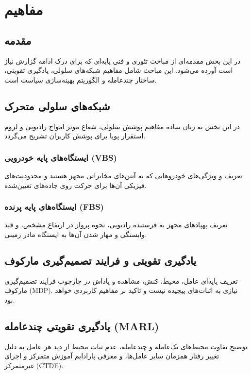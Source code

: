 \documentclass[a4paper,12pt,oneside]{report}
\begin{document}
\chapter{مفاهیم}

\section{مقدمه}
در این بخش مقدمه‌ای از مباحث تئوری و فنی پایه‌ای که برای درک ادامه گزارش نیاز است آورده می‌شود. این مباحث شامل مفاهیم شبکه‌های سلولی، یادگیری تقویتی، ساختار چندعامله و الگوریتم بهینه‌سازی سیاست است.

\section{شبکه‌های سلولی متحرک}
در این بخش به زبان ساده مفاهیم پوشش سلولی، شعاع موثر امواج رادیویی و لزوم استقرار پویا برای پوشش کاربران تشریح می‌گردد.

\subsection{ایستگاه‌های پایه خودرویی (VBS)}
تعریف و ویژگی‌های خودروهایی که به آنتن‌های مخابراتی مجهز هستند و محدودیت‌های فیزیکی آن‌ها برای حرکت روی جاده‌های تعیین‌شده.

\subsection{ایستگاه‌های پایه پرنده (FBS)}
تعریف پهپادهای مجهز به فرستنده رادیویی، نحوه پرواز در ارتفاع مشخص، و قید وابستگی و مهار شدن آن‌ها به ایستگاه مادر زمینی.

\section{یادگیری تقویتی و فرایند تصمیم‌گیری مارکوف}
تعریف پایه‌ای عامل، محیط، کنش، مشاهده و پاداش در چارچوب فرایند تصمیم‌گیری مارکوف (\gls{MDP}). نیازی به اثبات‌های پیچیده نیست و تاکید بر مفاهیم کاربردی خواهد بود.

\section{یادگیری تقویتی چندعامله (MARL)}
توضیح تفاوت محیط‌های تک‌عامله و چندعامله، عدم ثبات محیط از دید هر عامل به دلیل تغییر رفتار همزمان سایر عامل‌ها، و معرفی پارادایم آموزش متمرکز و اجرای غیرمتمرکز (\gls{CTDE}).
\end{document}
